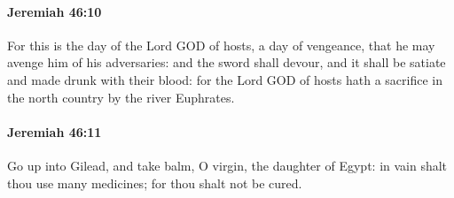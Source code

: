 		\paragraph{Jeremiah 46:10} %
			\label{JEREMIAH-46-10}

			For this is the day of the Lord GOD of hosts, a day of vengeance, that he may avenge him of his adversaries: and the sword shall devour, and it shall be satiate and made drunk with their blood: for the Lord GOD of hosts hath a sacrifice in the north country by the river Euphrates.


		\paragraph{Jeremiah 46:11} %
			\label{JEREMIAH-46-11}

			Go up into Gilead, and take balm, O virgin, the daughter of Egypt: in vain shalt thou use many medicines; for thou shalt not be cured.

